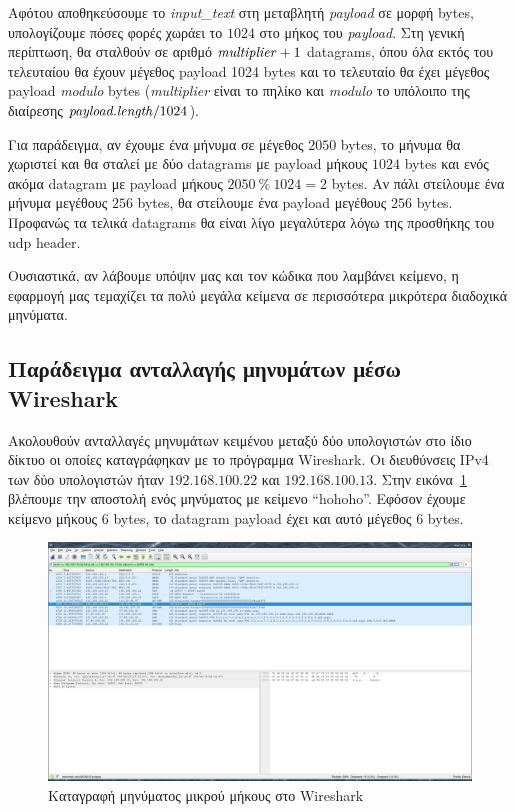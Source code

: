\documentclass{article}
\begin{document}
Αφότου αποθηκεύσουμε το \textit{input\_text} στη μεταβλητή 
\textit{payload} σε μορφή bytes, υπολογίζουμε πόσες φορές χωράει το
$1024$ στο μήκος του \textit{payload}. Στη γενική περίπτωση, θα σταλθούν σε αριθμό
$\text{\textit{multiplier}} + 1$ datagrams, όπου όλα εκτός του τελευταίου
θα έχουν μέγεθος payload 1024 bytes και το τελευταίο θα έχει μέγεθος payload \textit{modulo}
bytes (\textit{multiplier} είναι το πηλίκο και \textit{modulo} το υπόλοιπο
της διαίρεσης $\text{\textit{payload.length}} / 1024$).

Για παράδειγμα, αν έχουμε ένα μήνυμα σε μέγεθος $2050$ bytes, το 
μήνυμα θα χωριστεί και θα σταλεί με δύο datagrams με payload μήκους $1024$ bytes
και ενός ακόμα datagram με payload μήκους $2050\ \%\ 1024 = 2$ bytes. Αν πάλι στείλουμε
ένα μήνυμα μεγέθους $256$ bytes, θα στείλουμε ένα payload μεγέθους $256$ bytes. Προφανώς
τα τελικά datagrams θα είναι λίγο μεγαλύτερα λόγω της προσθήκης του udp header.

Ουσιαστικά, αν λάβουμε υπόψιν μας και τον κώδικα που λαμβάνει κείμενο, η εφαρμογή μας 
τεμαχίζει τα πολύ μεγάλα κείμενα σε περισσότερα μικρότερα διαδοχικά μηνύματα.

\subsection{Παράδειγμα ανταλλαγής μηνυμάτων μέσω Wireshark}
Ακολουθούν ανταλλαγές μηνυμάτων κειμένου μεταξύ δύο υπολογιστών στο ίδιο δίκτυο 
οι οποίες καταγράφηκαν με το πρόγραμμα Wireshark. Οι διευθύνσεις IPv4 των δύο υπολογιστών
ήταν $192.168.100.22$ και $192.168.100.13$. Στην εικόνα~\ref{text-simple-n-small} βλέπουμε 
την αποστολή ενός μηνύματος με κείμενο ``hohoho''. Εφόσον έχουμε κείμενο μήκους $6$ bytes,
το datagram payload έχει και αυτό μέγεθος $6$ bytes.

\begin{figure}
    \centering
    \includegraphics[scale=0.2]{text-simple-small.png}
    \caption{Καταγραφή μηνύματος μικρού μήκους στο Wireshark}\label{text-simple-n-small}
\end{figure}
\end{document}
